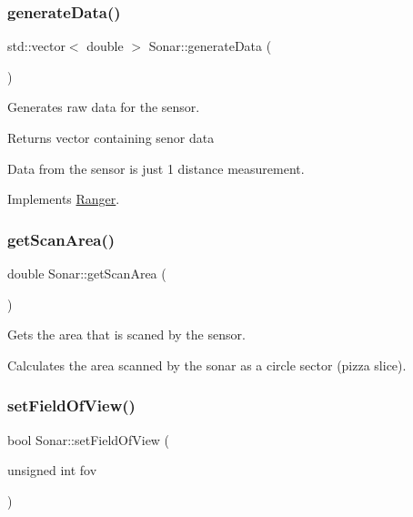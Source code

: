 \subsubsection{\texorpdfstring{generate\+Data()}{generateData()}}
{\footnotesize\ttfamily std\+::vector$<$ double $>$ Sonar\+::generate\+Data (\begin{DoxyParamCaption}{ }\end{DoxyParamCaption})\hspace{0.3cm}{\ttfamily [virtual]}}



Generates raw data for the sensor. 

\begin{DoxyReturn}{Returns}
vector containing senor data
\end{DoxyReturn}
Data from the sensor is just 1 distance measurement. 

Implements \hyperlink{classRanger_a1ac4a84f251b0793fc262643080f084a}{Ranger}.

\mbox{\label{classSonar_ac47b8e7936dfd5c3bde262baf301d46d}} 
\subsubsection{\texorpdfstring{get\+Scan\+Area()}{getScanArea()}}
{\footnotesize\ttfamily double Sonar\+::get\+Scan\+Area (\begin{DoxyParamCaption}{ }\end{DoxyParamCaption})}



Gets the area that is scaned by the sensor. 

Calculates the area scanned by the sonar as a circle sector (pizza slice). \mbox{\label{classSonar_a74d551d0ad61861ccf903f2535d799f0}} 
\subsubsection{\texorpdfstring{set\+Field\+Of\+View()}{setFieldOfView()}}
{\footnotesize\ttfamily bool Sonar\+::set\+Field\+Of\+View (\begin{DoxyParamCaption}\item[{unsigned int}]{fov }\end{DoxyParamCaption})\hspace{0.3cm}{\ttfamily [virtual]}}



